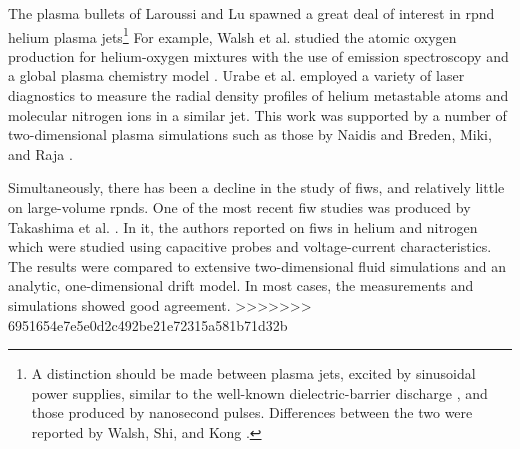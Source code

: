 The plasma bullets of Laroussi and Lu spawned a great deal of interest in
\acs{rpnd} helium plasma jets\footnote{A distinction should be made between
plasma jets, excited by sinusoidal power supplies, similar to the well-known
dielectric-barrier discharge \cite{Kogelschatz2003}, and those produced by
nanosecond pulses. Differences between the two were reported by Walsh, Shi, and
Kong \cite{Walsh2006}.} For example, Walsh et al. studied the atomic oxygen
production for helium-oxygen mixtures with the use of emission spectroscopy and
a global plasma chemistry model \cite{Walsh2010}. Urabe et al. employed a
variety of laser diagnostics to measure the radial density profiles of helium
metastable atoms and molecular nitrogen ions in a similar jet. This work was
supported by a number of two-dimensional plasma simulations such as those by
Naidis \cite{Naidis2010} and Breden, Miki, and Raja \cite{Breden2011}.

Simultaneously, there has been a decline in the study of \acs{fiw}s, and
relatively little on large-volume \acs{rpnd}s. One of the most recent \acs{fiw}
studies was produced by Takashima et al. \cite{Takashima2011}. In it, the
authors reported on \acs{fiw}s in helium and nitrogen which were studied using
capacitive probes and voltage-current characteristics. The results were compared
to extensive two-dimensional fluid simulations and an analytic, one-dimensional
drift model. In most cases, the measurements and simulations showed good
agreement.
>>>>>>> 6951654e7e5e0d2c492be21e72315a581b71d32b
